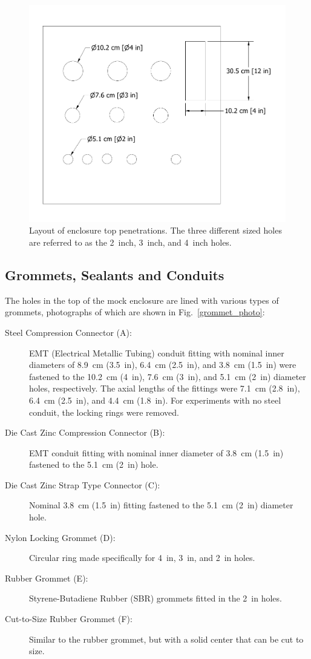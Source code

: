 \begin{figure}[p]
\includegraphics[width=\textwidth]{../FIGURES/Cabinet_Top_Assembly_No_Dims}
\caption[Layout of enclosure top penetrations]{Layout of enclosure top penetrations. The three different sized holes are referred to as the 2~inch, 3~inch, and 4~inch holes.}
\label{mock_cabinet_penetrations}
\end{figure}

\FloatBarrier

\subsection{Grommets, Sealants and Conduits}

The holes in the top of the mock enclosure are lined with various types of grommets, photographs of which are shown in Fig.~\ref{grommet_photo}:
\begin{description}
\item[Steel Compression Connector (A):] EMT (Electrical Metallic Tubing) conduit fitting with nominal inner diameters of 8.9~cm (3.5~in), 6.4~cm (2.5~in), and 3.8~cm (1.5~in) were fastened to the 10.2~cm (4~in), 7.6~cm (3~in), and 5.1~cm (2~in) diameter holes, respectively. The axial lengths of the fittings were 7.1~cm (2.8~in), 6.4~cm (2.5~in), and 4.4~cm (1.8~in). For experiments with no steel conduit, the locking rings were removed.
\item[Die Cast Zinc Compression Connector (B):] EMT conduit fitting with nominal inner diameter of 3.8~cm (1.5~in) fastened to the 5.1~cm (2~in) hole.
\item[Die Cast Zinc Strap Type Connector (C):] Nominal 3.8~cm (1.5~in) fitting fastened to the 5.1~cm (2~in) diameter hole.
\item[Nylon Locking Grommet (D):] Circular ring made specifically for 4~in, 3~in, and 2~in holes.
\item[Rubber Grommet (E):] Styrene-Butadiene Rubber (SBR) grommets fitted in the 2~in holes.
\item[Cut-to-Size Rubber Grommet (F):] Similar to the rubber grommet, but with a solid center that can be cut to size.
\end{description}

